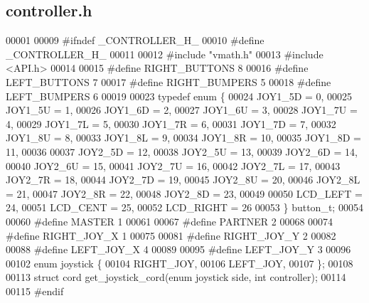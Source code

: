\subsection{controller.\+h}
\label{a00011_source}

\begin{DoxyCode}
00001 
00009 \textcolor{preprocessor}{#ifndef \_CONTROLLER\_H\_}
00010 \textcolor{preprocessor}{#define \_CONTROLLER\_H\_}
00011 
00012 \textcolor{preprocessor}{#include "vmath.h"}
00013 \textcolor{preprocessor}{#include <API.h>}
00014 
00015 \textcolor{preprocessor}{#define RIGHT\_BUTTONS 8}
00016 \textcolor{preprocessor}{#define LEFT\_BUTTONS 7}
00017 \textcolor{preprocessor}{#define RIGHT\_BUMPERS 5}
00018 \textcolor{preprocessor}{#define LEFT\_BUMPERS 6}
00019 
00023 \textcolor{keyword}{typedef} \textcolor{keyword}{enum} \{
00024   JOY1_5D = 0,
00025   JOY1_5U = 1,
00026   JOY1_6D = 2,
00027   JOY1_6U = 3,
00028   JOY1_7U = 4,
00029   JOY1_7L = 5,
00030   JOY1_7R = 6,
00031   JOY1_7D = 7,
00032   JOY1_8U = 8,
00033   JOY1_8L = 9,
00034   JOY1_8R = 10,
00035   JOY1_8D = 11,
00036 
00037   JOY2_5D = 12,
00038   JOY2_5U = 13,
00039   JOY2_6D = 14,
00040   JOY2_6U = 15,
00041   JOY2_7U = 16,
00042   JOY2_7L = 17,
00043   JOY2_7R = 18,
00044   JOY2_7D = 19,
00045   JOY2_8U = 20,
00046   JOY2_8L = 21,
00047   JOY2_8R = 22,
00048   JOY2_8D = 23,
00049 
00050   LCD_LEFT = 24,
00051   LCD_CENT = 25,
00052   LCD_RIGHT = 26
00053 \} button_t;
00054 
00060 \textcolor{preprocessor}{#define MASTER 1}
00061 
00067 \textcolor{preprocessor}{#define PARTNER 2}
00068 
00074 \textcolor{preprocessor}{#define RIGHT\_JOY\_X 1}
00075 
00081 \textcolor{preprocessor}{#define RIGHT\_JOY\_Y 2}
00082 
00088 \textcolor{preprocessor}{#define LEFT\_JOY\_X 4}
00089 
00095 \textcolor{preprocessor}{#define LEFT\_JOY\_Y 3}
00096 
00102 \textcolor{keyword}{enum} joystick \{
00104   RIGHT_JOY,
00106   LEFT_JOY,
00107 \};
00108 
00113 \textcolor{keyword}{struct }cord get_joystick_cord(enum joystick side, int controller);
00114 
00115 \textcolor{preprocessor}{#endif}
\end{DoxyCode}
